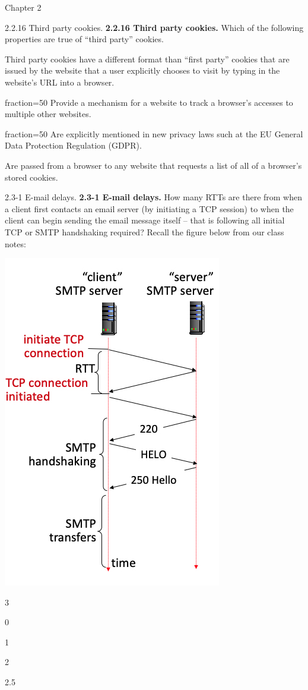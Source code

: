 \documentclass[a4paper]{article}
\begin{document}
\begin{quiz}{Chapter 2}
\begin{multi}[points=1,shuffle,multiple]{2.2.16 Third party cookies.}
\textbf{2.2.16 Third party cookies.} 
Which of the following properties are true of ``third party'' cookies.

\item Third party cookies have a different format than ``first party'' cookies that are issued by the website that a user explicitly chooses to visit by typing in the website's URL into a browser.
\item[fraction=50] Provide a mechanism for a website to track a browser's accesses to multiple other websites.
\item[fraction=50] Are explicitly mentioned in new privacy laws such at the EU General Data Protection Regulation (GDPR).
\item Are passed from a browser to any website that requests a list of all of a browser's stored cookies.
\end{multi}

\begin{multi}[points=1,shuffle]{2.3-1 E-mail delays.}
\textbf{2.3-1 E-mail delays.} 
How many RTTs are there from when a client first contacts an email server (by initiating a TCP session) to when the client can begin sending the email message itself -- that is following all initial TCP or SMTP handshaking required? 
Recall the figure below from our class notes: 
\begin{center}
\includegraphics[width=.4\linewidth]{figs/2.3.1.jpg}
\end{center}
\item* 3
\item 0
\item 1
\item 2
\item 2.5
\end{multi}


\end{quiz}
\end{document}
